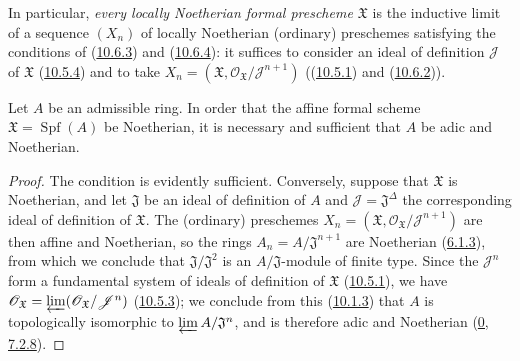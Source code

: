 In particular, \emph{every locally Noetherian formal prescheme
$\mathfrak{X}$} is the inductive limit of a sequence $(X_n)$ of locally
Noetherian (ordinary) preschemes satisfying the conditions of
(\hyperref[I.10.6.3]{10.6.3}) and
(\hyperref[I.10.6.4]{10.6.4}): it suffices to consider an ideal of
definition $\mathscr{J}$ of $\mathfrak{X}$
(\hyperref[I.10.5.4]{10.5.4}) and to take
$X_n=(\mathfrak{X},
\mathscr{O}_{\mathfrak{X}}/\mathscr{J}^{n+1})$
((\hyperref[I.10.5.1]{10.5.1}) and
(\hyperref[I.10.6.2]{10.6.2})).

\begin{corollary}[10.6.5]
\label{I.10.6.5}
Let $A$ be an admissible ring. In order that the affine formal scheme
$\mathfrak{X}=\operatorname{Spf}(A)$ be Noetherian, it is necessary and
sufficient that $A$ be adic and Noetherian.
\end{corollary}

\begin{proof}
The condition is evidently sufficient. Conversely, suppose that
$\mathfrak{X}$ is Noetherian, and let $\mathfrak{J}$ be an ideal of
definition of $A$ and $\mathscr{J}=\mathfrak{J}^\Delta$ the corresponding
ideal of definition of $\mathfrak{X}$. The (ordinary) preschemes
$X_n=(\mathfrak{X},
\mathscr{O}_{\mathfrak{X}}/\mathscr{J}^{n+1})$ are then affine and
Noetherian, so the rings
$A_n=A/\mathfrak{J}^{n+1}$ are Noetherian
(\hyperref[I.6.1.3]{6.1.3}), from which we conclude that
$\mathfrak{J}/\mathfrak{J}^2$ is an $A/\mathfrak{J}$-module of finite
type. Since the $\mathscr{J}^n$ form a fundamental system of ideals
of definition of $\mathfrak{X}$
(\hyperref[I.10.5.1]{10.5.1}), we have
$\mathscr{O}_{\mathfrak{X}}
=\varprojlim(\mathscr{O}_{\mathfrak{X}}/\mathscr{J}^n)$
(\hyperref[I.10.5.3]{10.5.3}); we conclude from this
(\hyperref[I.10.1.3]{10.1.3}) that $A$ is topologically isomorphic to
$\varprojlim A/\mathfrak{J}^n$, and is therefore adic and Noetherian
(\hyperref[0.7.2.8]{0, 7.2.8}).
\end{proof}

